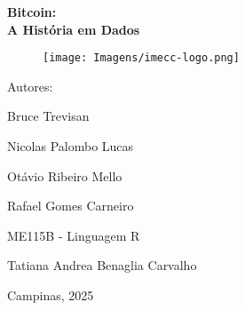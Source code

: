 
\begin{titlepage}
    \centering
    \vspace*{2.5cm}
    
    {\Huge \bfseries Bitcoin: \\ A História em Dados \par}
    
    \vspace{2cm}

    \begin{figure} [h]
        \centering
        \texttt{[image: Imagens/imecc-logo.png]}
    \end{figure}

    { 
        {\large Autores: \par}
        {\large Bruce Trevisan \par}
        {\large Nicolas Palombo Lucas \par}
        {\large Otávio Ribeiro Mello \par}
        {\large Rafael Gomes Carneiro \par}
    }
    
    \vfill
    {\large ME115B - Linguagem R \par}
    {\large Tatiana Andrea Benaglia Carvalho \par}
    {\large Campinas, 2025 \par}
    
    
\end{titlepage}

\clearpage

\tableofcontents
